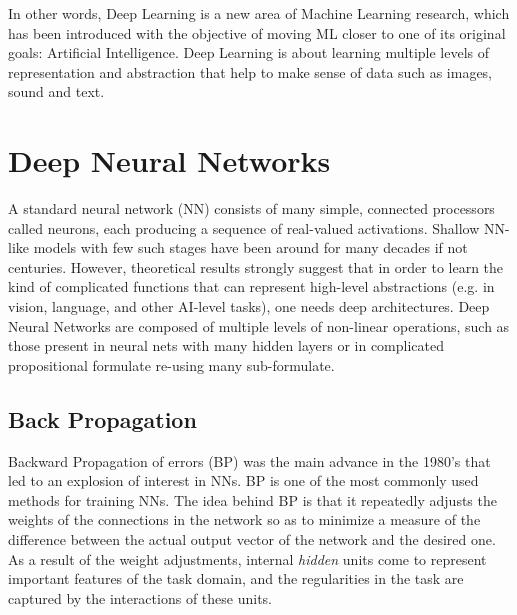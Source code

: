 In other words,  Deep Learning is a new area of Machine Learning research, which has been introduced with the objective of moving ML closer to one of its original goals: Artificial Intelligence. Deep Learning is about learning multiple levels of representation and abstraction that help to make sense of data such as images, sound and text\cite{tutorial2014lisa}.  

\section{Deep Neural Networks}

A standard neural network (NN) consists of many simple, connected processors called neurons, each producing a sequence of real-valued activations. Shallow NN-like models with few such stages have been around for many decades if not centuries\cite{deepnn}. However, theoretical results strongly suggest that in order to learn the kind of complicated functions that can represent high-level abstractions (e.g. in vision, language, and other AI-level tasks), one needs deep architectures. Deep Neural Networks are composed of multiple levels of non-linear operations, such as those present in neural nets with many hidden layers or in complicated propositional formulate re-using many sub-formulate\cite{bengio2009learning}. 


\subsection{Back Propagation}

Backward Propagation of errors (BP) was the main advance in the 1980's that led to an explosion of interest in NNs. BP is one of the most commonly used methods for training NNs. The idea behind BP is that it repeatedly adjusts the weights of the connections in the network so as to minimize a measure of the difference between the actual output vector of the network and the desired one. As a result of the weight adjustments, internal \textit{hidden} units come to represent important features of the task domain, and the regularities in the task are captured by the interactions of these units\cite{williams1986learning}.

